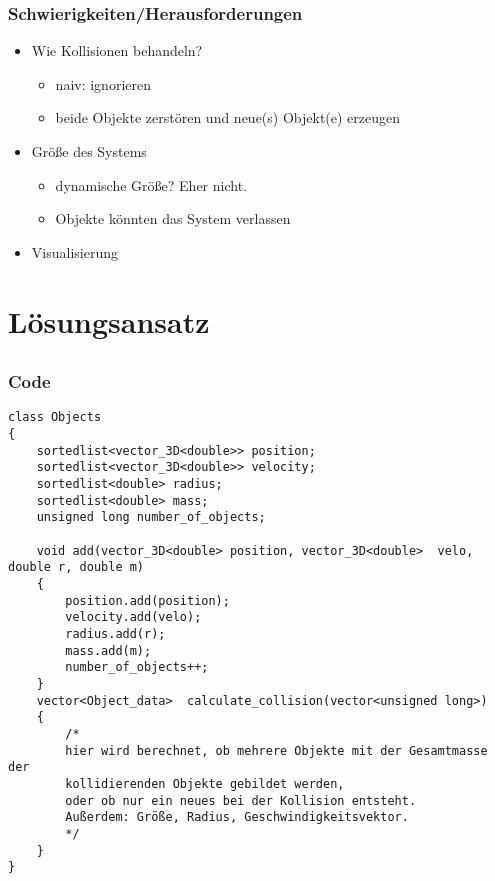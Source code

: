 \documentclass{beamer}
\begin{document}

\begin{frame}
    \frametitle{Schwierigkeiten/Herausforderungen}
    \begin{itemize}
        \item Wie Kollisionen behandeln?
            \begin{itemize}
                \item naiv: ignorieren
                \item beide Objekte zerstören und neue(s) Objekt(e) erzeugen
            \end{itemize}
        \item Größe des Systems
            \begin{itemize}
                \item dynamische Größe? Eher nicht.
                \item Objekte könnten das System verlassen
            \end{itemize}
        \item Visualisierung
    \end{itemize}
\end{frame}


\section{Lösungsansatz}
\subsection{}


\begin{frame}[fragile]
    \frametitle{Code}
    \begin{verbatim}
class Objects
{
    sortedlist<vector_3D<double>> position;
    sortedlist<vector_3D<double>> velocity;
    sortedlist<double> radius;
    sortedlist<double> mass;
    unsigned long number_of_objects;

    void add(vector_3D<double> position, vector_3D<double>  velo, double r, double m)
    {
        position.add(position);
        velocity.add(velo);
        radius.add(r);
        mass.add(m);
        number_of_objects++;
    }
    vector<Object_data>  calculate_collision(vector<unsigned long>)
    {
        /*
        hier wird berechnet, ob mehrere Objekte mit der Gesamtmasse der
        kollidierenden Objekte gebildet werden,
        oder ob nur ein neues bei der Kollision entsteht.
        Außerdem: Größe, Radius, Geschwindigkeitsvektor.
        */
    }
}
    \end{verbatim}
\end{frame}
\end{document}
